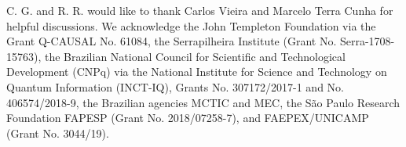 \documentclass[a4paper,preprintnumbers,floatfix,superscriptaddress,pra,twocolumn,showpacs,notitlepage,longbibliography]{revtex4-2}
\begin{document}
\begin{acknowledgments}
C. G. and R. R. would like to thank Carlos Vieira and Marcelo Terra Cunha for helpful discussions. We acknowledge the John Templeton Foundation via the Grant Q-CAUSAL No. 61084, the Serrapilheira Institute (Grant No. Serra-1708-15763), the Brazilian National Council for Scientific and Technological Development (CNPq) via the National Institute for Science and Technology on Quantum Information (INCT-IQ), Grants No. 307172/2017-1 and No. 406574/2018-9, the Brazilian agencies MCTIC and MEC, the S\~{a}o Paulo Research Foundation FAPESP (Grant No. 2018/07258-7), and FAEPEX/UNICAMP (Grant No. 3044/19).
\end{acknowledgments}    



\end{document}
